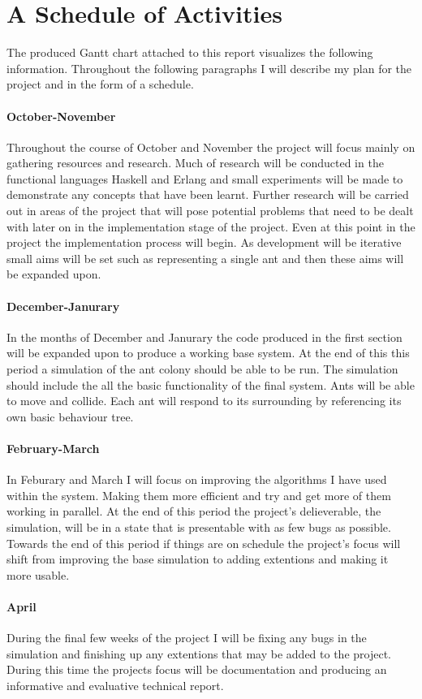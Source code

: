 \documentclass{report}
\begin{document}
\section{A Schedule of Activities}
The produced Gantt chart attached to this report visualizes the following information. Throughout the following paragraphs I will describe my plan for the project and in the form of a schedule. 

\paragraph{October-November}
Throughout the course of October and November the project will focus mainly on gathering resources  and research. Much of research will be conducted in the functional languages Haskell and Erlang and small experiments will be made to demonstrate any concepts that have been learnt. Further research will be carried out in areas of the project that will pose potential problems that need to be dealt with later on in the implementation stage of the project. Even at this point in the project the implementation process will begin. As development will be iterative small aims will be set such as representing a single ant and then these aims will be expanded upon.
\paragraph{December-Janurary}
In the months of December and Janurary the code produced in the first section will be expanded upon to produce a working base system. At the end of this this period a simulation of the ant colony should be able to be run. The simulation should include the all the basic functionality of the final system. Ants will be able to move and collide. Each ant will respond to its surrounding by referencing its own basic behaviour tree.
\paragraph{February-March}
In Feburary and March I will focus on improving the algorithms I have used within the system. Making them more efficient and try and get more of them working in parallel. At the end of this period the project's delieverable, the simulation, will be in a state that is presentable with as few bugs as possible. Towards the end of this period if things are on schedule the project's focus will shift from improving the base simulation to adding extentions and making it more usable.
\paragraph{April}
During the final few weeks of the project I will be fixing any bugs in the simulation and finishing up any extentions that may be added to the project. During this time the projects focus will be documentation and producing an informative and evaluative technical report.
\end{document}
